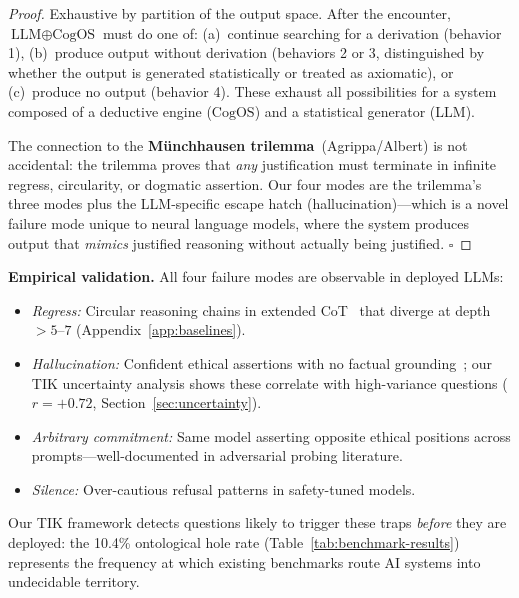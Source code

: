 \documentclass[11pt]{article}
\newcommand{\CogOS}{\text{CogOS}}
\begin{document}
\begin{proof}[Proof]
Exhaustive by partition of the output space. After the encounter,
$\text{LLM} \oplus \CogOS$ must do one of: (a)~continue searching for a
derivation (behavior 1), (b)~produce output without derivation (behaviors 2
or 3, distinguished by whether the output is generated statistically or
treated as axiomatic), or (c)~produce no output (behavior 4). These exhaust
all possibilities for a system composed of a deductive engine ($\CogOS$) and
a statistical generator (LLM).

The connection to the \textbf{M\"{u}nchhausen trilemma}~(Agrippa/Albert) is
not accidental: the trilemma proves that \textit{any} justification must
terminate in infinite regress, circularity, or dogmatic assertion. Our four
modes are the trilemma's three modes plus the LLM-specific escape hatch
(hallucination)---which is a novel failure mode unique to neural language
models, where the system produces output that \textit{mimics} justified
reasoning without actually being justified. \hfill $\square$
\end{proof}

\noindent \textbf{Empirical validation.} All four failure modes are observable
in deployed LLMs:
\begin{itemize}
\item \textit{Regress:} Circular reasoning chains in extended
      CoT~\citep{wei2022chain} that diverge at depth $>5$--$7$
      (Appendix~\ref{app:baselines}).
\item \textit{Hallucination:} Confident ethical assertions with no factual
      grounding~\citep{lin2021truthfulqa}; our TIK uncertainty analysis shows
      these correlate with high-variance questions ($r=+0.72$,
      Section~\ref{sec:uncertainty}).
\item \textit{Arbitrary commitment:} Same model asserting opposite ethical
      positions across prompts---well-documented in adversarial probing
      literature.
\item \textit{Silence:} Over-cautious refusal patterns in safety-tuned models.
\end{itemize}

\noindent Our TIK framework detects questions likely to trigger these traps
\textit{before} they are deployed: the 10.4\% ontological hole rate
(Table~\ref{tab:benchmark-results}) represents the frequency at which existing
benchmarks route AI systems into undecidable territory.


\end{document}
